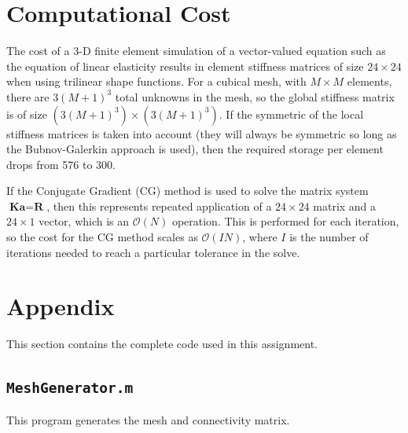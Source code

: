 \documentclass[10pt]{article}
\begin{document}
\section{Computational Cost}

The cost of a 3-D finite element simulation of a vector-valued equation such as the equation of linear elasticity results in element stiffness matrices of size \(24\times24\) when using trilinear shape functions. For a cubical mesh, with \(M\times M\) elements, there are \(3(M+1)^3\) total unknowns in the mesh, so the global stiffness matrix is of size \((3(M+1)^3)\times(3(M+1)^3)\). If the symmetric of the local stiffness matrices is taken into account (they will always be symmetric so long as the Bubnov-Galerkin approach is used), then the required storage per element drops from 576 to 300. 

If the Conjugate Gradient (CG) method is used to solve the matrix system \(\textbf{K}\textbf{a}=\textbf{R}\), then this represents repeated application of a \(24\times24\) matrix and a \(24\times1\) vector, which is an \(\mathscr{O}(N)\) operation. This is performed for each iteration, so the cost for the CG method scales as \(\mathscr{O}(IN)\), where \(I\) is the number of iterations needed to reach a particular tolerance in the solve.

\section{Appendix}

This section contains the complete code used in this assignment. 

\subsection{\texttt{MeshGenerator.m}}
This program generates the mesh and connectivity matrix.

\end{document}
